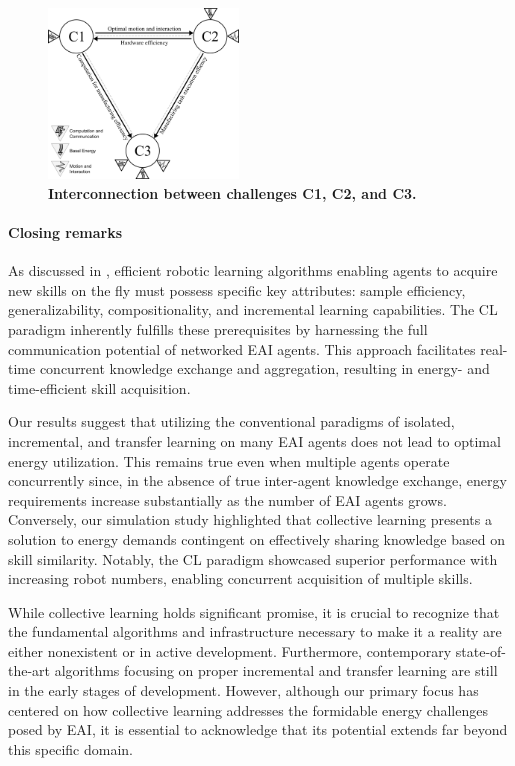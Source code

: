 \documentclass[12pt]{article}
\begin{document}
\begin{figure}[!t]
	\centering
	\includegraphics[width=0.45\textwidth]{fig/grand_challenges_connections.png}
	\caption{\textbf{Interconnection between challenges C1, C2, and C3.}}
	\label{fig:challengesConnected}
\end{figure}

\paragraph*{Closing remarks}
As discussed in \cite{Kaelbling2020foundationefficientrobot}, efficient robotic learning algorithms enabling agents to acquire new skills on the fly must possess specific key attributes: sample efficiency, generalizability, compositionality, and incremental learning capabilities. The CL paradigm inherently fulfills these prerequisites by harnessing the full communication potential of networked EAI agents. This approach facilitates real-time concurrent knowledge exchange and aggregation, resulting in energy- and time-efficient skill acquisition.

Our results suggest that utilizing the conventional paradigms of isolated, incremental, and transfer learning on many EAI agents does not lead to optimal energy utilization. This remains true even when multiple agents operate concurrently since, in the absence of true inter-agent knowledge exchange, energy requirements increase substantially as the number of EAI agents grows. Conversely, our simulation study highlighted that collective learning presents a solution to energy demands contingent on effectively sharing knowledge based on skill similarity. Notably, the CL paradigm showcased superior performance with increasing robot numbers, enabling concurrent acquisition of multiple skills.

While collective learning holds significant promise, it is crucial to recognize that the fundamental algorithms and infrastructure necessary to make it a reality are either nonexistent or in active development. Furthermore, contemporary state-of-the-art algorithms focusing on proper incremental and transfer learning are still in the early stages of development. However, although our primary focus has centered on how collective learning addresses the formidable energy challenges posed by EAI, it is essential to acknowledge that its potential extends far beyond this specific domain.
\end{document}
